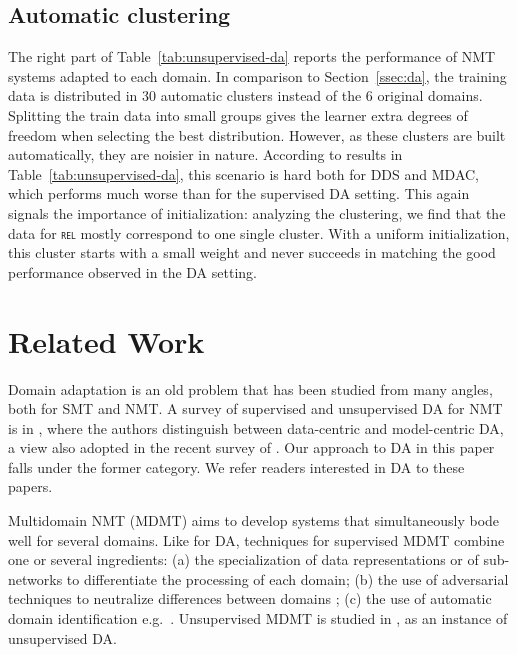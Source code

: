 \documentclass[11pt]{article}
\newcommand{\domain}[1]{\texttt{\textsc{#1}}}
\begin{document}
\subsection{Automatic clustering}\label{ssec:clda}
The right part of Table~\ref{tab:unsupervised-da} reports the performance of NMT systems adapted to each domain.
In comparison to Section~\ref{ssec:da}, the training data is distributed in 30 automatic clusters instead of the 6 original domains. Splitting the train data into small groups gives the learner extra degrees of freedom when selecting the best distribution. However, as these clusters are built automatically, they are noisier in nature. According to results in Table~\ref{tab:unsupervised-da}, this scenario is hard both for DDS and MDAC, which performs much worse than for the supervised DA setting. This again signals the importance of initialization: analyzing the clustering, we find that the data for \domain{rel} mostly correspond to one single cluster. With a uniform initialization, this cluster starts with a small weight and never succeeds in matching the good performance observed in the DA setting.

\section{Related Work \label{sec:related}}

Domain adaptation is an old problem that has been studied from many angles, both for SMT and NMT. A survey of supervised and unsupervised DA for NMT is in \cite{Chu18asurvey}, where the authors distinguish between data-centric and model-centric DA, a view also adopted in the recent survey of . Our approach to DA in this paper falls under the former category. We refer readers interested in DA to these papers.

Multidomain NMT (MDMT) aims to develop systems that simultaneously bode well for several domains. Like for DA, techniques for supervised MDMT combine one or several ingredients: (a) the specialization of data representations \cite{Kobus17domaincontrol} or of sub-networks \cite{Pham19generic} to differentiate the processing of each domain; (b) the use of adversarial techniques to neutralize differences between domains \cite{Britz17mixing,Zeng18multidomain}; (c) the use of automatic domain identification e.g.\ . Unsupervised MDMT is studied in , as an instance of unsupervised DA.
\end{document}
